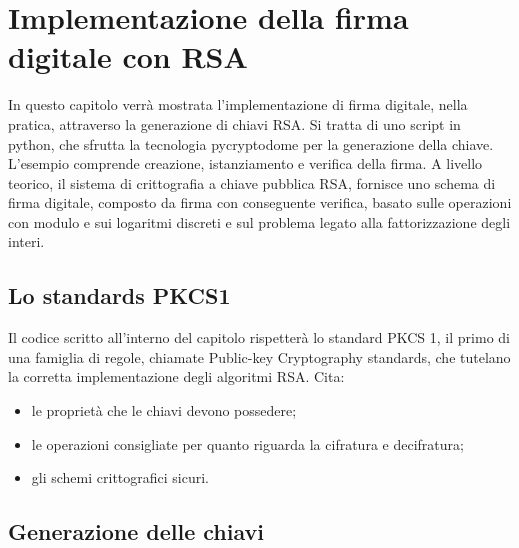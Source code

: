 \chapter{Implementazione della firma digitale con RSA}

In questo capitolo verrà mostrata l'implementazione di firma digitale, nella pratica, attraverso la generazione di chiavi RSA. Si tratta di uno script in python, che sfrutta la tecnologia pycryptodome per la generazione della chiave. L'esempio comprende creazione, istanziamento e verifica della firma. A livello teorico, il sistema di crittografia a chiave pubblica RSA, fornisce uno schema di firma digitale, composto da firma con conseguente verifica, basato sulle operazioni con modulo e sui logaritmi discreti e sul problema legato alla fattorizzazione degli interi.

\section{Lo standards PKCS1}

Il codice scritto all'interno del capitolo rispetterà lo standard PKCS 1, il primo di una famiglia di regole, chiamate Public-key Cryptography standards, che tutelano la corretta implementazione degli algoritmi RSA.
Cita:
\begin{itemize}
	\item le proprietà che le chiavi devono possedere;
	\item le operazioni consigliate per quanto riguarda la cifratura e decifratura;
	\item gli schemi crittografici sicuri.
\end{itemize} 

\section{Generazione delle chiavi}

